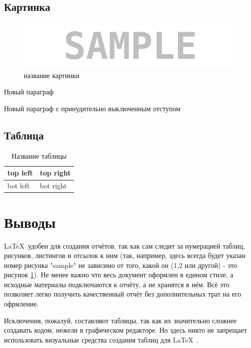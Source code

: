 \subsection{Картинка}

\begin{figure}[H]
	\begin{center}
		\includegraphics[scale=0.7]{pics/sample}
		\caption{название картинки} 
		\label{pic:pic_name} %
	\end{center}
\end{figure}


Новый параграф

\noindent Новый параграф с принудительно выключенным отступом


\subsection{Таблица}

\begin{table}[H]
	\begin{center}
		\begin{tabular}{|l|l|}
			\hline
			top left & top right\\ \hline
			bot left & bot right\\ \hline
		\end{tabular}
		\caption{ Название таблицы}
		\label{tabular:tab_examp}
	\end{center}
\end{table}

\section{Выводы}
\LaTeX\ удобен для создания отчётов, так как сам следит за нумерацией таблиц, рисунков, листингов и отсылок к ним (так, например, здесь всегда будет указан номер рисунка "sample" не зависимо от того, какой он (1,2 или другой) - это рисунок \ref{pic:pic_name}). Не менее важно что весь документ оформлен в едином стиле, а исходные материалы подключаются к отчёту, а не хранятся в нём. Всё это позволяет легко получить качественный отчёт без дополнительных трат на его офрмление.

Исключения, пожалуй, составляют таблицы, так как их значительно сложнее создавать кодом, нежели в графическом редакторе. Но здесь никто не запрещает использовать визуальные средства создания таблиц для \LaTeX\ .


